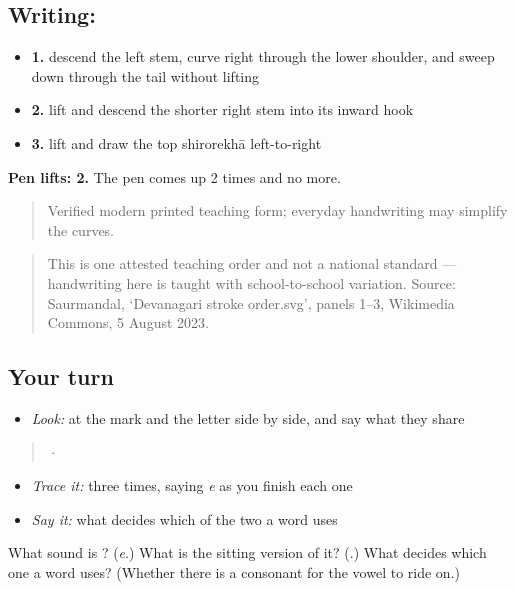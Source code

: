 \subsection*{Writing: }

\begin{itemize}
\raggedright
  \item \textbf{1.} descend the left stem, curve right through the lower shoulder, and sweep down through the tail without lifting
  \item \textbf{2.} lift and descend the shorter right stem into its inward hook
  \item \textbf{3.} lift and draw the top shirorekhā left-to-right
\end{itemize}

\textbf{Pen lifts: 2.} The pen comes up 2 times and no more.

\begin{quote}
Verified modern printed teaching form; everyday handwriting may simplify the curves.
\end{quote}

\begin{quote}
This is one attested teaching order and not a national standard — handwriting here is taught with school-to-school variation. Source: Saurmandal, ‘Devanagari  stroke order.svg’, panels 1–3, Wikimedia Commons, 5 August 2023.
\end{quote}

\subsection*{Your turn}
\begin{itemize}
\raggedright
  \item \emph{Look:} at the mark and the letter side by side, and say what they share
\end{itemize}

\begin{quote}
  ·  
\end{quote}

\begin{itemize}
\raggedright
  \item \emph{Trace it:}  three times, saying \emph{e} as you finish each one
  \item \emph{Say it:} what decides which of the two a word uses
\end{itemize}

\begin{tcolorbox}[breakable,colback=teal!4,colframe=teal!35!black,title={Before you move on}]
What sound is \textbf{}? (\emph{e}.) What is the sitting version of it? (\textbf{}.) What decides which one a word uses? (Whether there is a consonant for the vowel to ride on.)
\end{tcolorbox}
